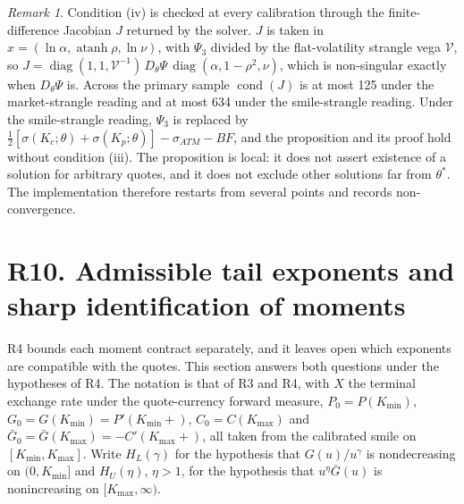 \documentclass[11pt]{article}
\theoremstyle{remark}
\newtheorem{remark}[proposition]{Remark}
\begin{document}
\begin{remark}
Condition (iv) is checked at every calibration through the finite-difference Jacobian $J$ returned by the solver. $J$ is taken in $x=(\ln\alpha,\operatorname{atanh}\rho,\ln\nu)$, with $\Psi_3$ divided by the flat-volatility strangle vega $\mathcal V$, so $J=\operatorname{diag}(1,1,\mathcal V^{-1})\,D_\theta\Psi\,\operatorname{diag}(\alpha,1-\rho^2,\nu)$, which is non-singular exactly when $D_\theta\Psi$ is. Across the primary sample $\operatorname{cond}(J)$ is at most 125 under the market-strangle reading and at most 634 under the smile-strangle reading. Under the smile-strangle reading, $\Psi_3$ is replaced by $\tfrac12[\sigma(K_c;\theta)+\sigma(K_p;\theta)]-\sigma_{ATM}-BF$, and the proposition and its proof hold without condition (iii). The proposition is local: it does not assert existence of a solution for arbitrary quotes, and it does not exclude other solutions far from $\theta^*$. The implementation therefore restarts from several points and records non-convergence.
\end{remark}

\section*{R10. Admissible tail exponents and sharp identification of moments}

R4 bounds each moment contract separately, and it leaves open which exponents are compatible with the quotes. This section answers both questions under the hypotheses of R4. The notation is that of R3 and R4, with $X$ the terminal exchange rate under the quote-currency forward measure, $P_0=P(K_{\min})$, $G_0=G(K_{\min})=P'(K_{\min}+)$, $C_0=C(K_{\max})$ and $\bar G_0=\bar G(K_{\max})=-C'(K_{\max}+)$, all taken from the calibrated smile on $[K_{\min},K_{\max}]$. Write $H_L(\gamma)$ for the hypothesis that $G(u)/u^\gamma$ is nondecreasing on $(0,K_{\min}]$ and $H_U(\eta)$, $\eta>1$, for the hypothesis that $u^\eta\bar G(u)$ is nonincreasing on $[K_{\max},\infty)$.
\end{document}
